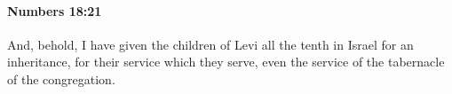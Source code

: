 
		\paragraph{Numbers 18:21} %
			\label{NUMBERS-18-21}

			And, behold, I have given the children of Levi all the tenth in Israel for an inheritance, for their service which they serve, even the service of the tabernacle of the congregation.



